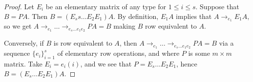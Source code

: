 \begin{proof}
    Let $E_i$ be an elementary matrix of any type for  $1 \leq i \leq s$. Suppose that  $B=PA$. Then
    $B=(E_ss \dots E_2E_1)A$. By definition, $E_1A$ implies that $A \rightarrow_{e_1} E_1A$, so we
    get $A \rightarrow_{e_1} \dots \rightarrow_{e_s \dots e_1e_2} PA=B$ making $B$ row equivalent to
     $A$.

     Conversely, if  $B$ is row equivalent to  $A$, then  $A \rightarrow_{e_1} \dots
     \rightarrow_{e_s \dots e_1e_2} PA=B$ via a sequence $\{e_i\}_{i=1}^s$ of elementary row
     operations, and where $P$ is some $m \times m$ matrix. Take $E_i=e_i(i)$, and we see that
     $P=E_s \dots E_2E_1$, hence $B=(E_s \dots E_2E_1)A$.
\end{proof}
